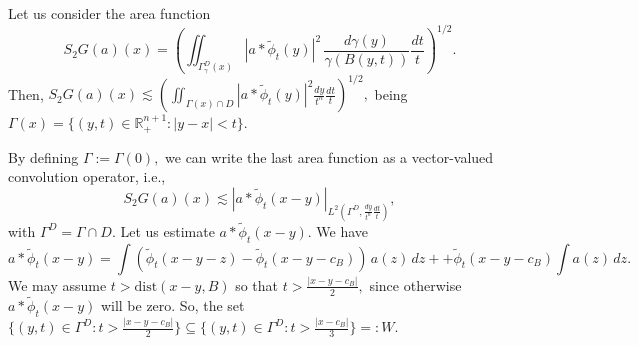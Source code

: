 \documentclass[leqno,11pt]{amsart}
\theoremstyle{plain}
\theoremstyle{remark}
\begin{document}
{{Let us consider the area function 
 $$S_2G(a)(x)=\left(\iint_{\Gamma_\gamma^D (x)}|a\ast \widetilde{\phi}_t(y)|^2\, \frac{d\gamma(y)}{\gamma(B(y,t))}\frac{dt}{t}\right)^{1/2}.$$ Then, $S_2G(a)(x)\lesssim \left(\iint_{\Gamma(x)\cap D}|a\ast\widetilde{\phi}_t(y)|^2\frac{dy}{t^n}\frac{dt}{t}\right)^{1/2},$ being $\Gamma (x)=\{(y,t)\in \mathbb{R}^{n+1}_+: |y-x|<t\}.$

 
 
 By defining $\Gamma:=\Gamma (0),$ we can write the last area function as a vector-valued convolution operator, i.e.,
$$S_2G(a)(x)\lesssim\left|a\ast \widetilde{\phi}_t (x-y) \right|_{L^2(\Gamma^D, \frac{dy}{t^n}\frac{dt}{t})},$$ with $\Gamma^D=\Gamma\cap D.$ Let us estimate $a\ast \widetilde{\phi}_t(x-y).$ We have
$$a\ast \widetilde{\phi}_t(x-y)=\int (\widetilde{\phi}_t(x-y-z)-\widetilde{\phi}_t(x-y-c_B))\, a(z)\, dz++ \widetilde{\phi}_t(x-y-c_B)\int a(z)\, dz.$$ 
We may assume $t>\text{dist}(x-y, B)$ so that $t>\frac{|x-y-c_B|}{2},$ since otherwise $a\ast \widetilde{\phi}_t(x-y)$ will be zero. So, the set $\{(y,t)\in \Gamma^D: t>\frac{|x-y-c_B|}{2}\}\subseteq \{(y,t)\in \Gamma^D: t>\frac{|x-c_B|}{3}\}=: W.$

}}
\end{document}
